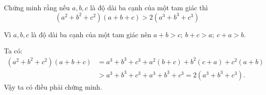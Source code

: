 \begin{problem}
	Chứng minh rằng nếu $a, b, c$ là độ dài ba cạnh của một tam giác thì
	$$
		(a^2 + b^2 + c^2)(a + b + c) > 2(a^3 + b^3 + c^3)
	$$

	\solution
	
	Vì $a, b, c$ là độ dài ba cạnh của một tam giác nên $a + b > c;\ b + c > a;\ c + a > b$.

	Ta có:
	\begin{align*}
		(a^2 + b^2 + c^2)(a + b + c) &= a^3 + b^3 + c^3 + a^2(b + c) + b^2(c + a) + c^2(a + b) \\
		&> a^3 + b^3 + c^3 + a^3 + b^3 + c^3 = 2(a^3 + b^3 + c^3).	
	\end{align*}
	Vậy ta có điều phải chứng minh.
\end{problem}